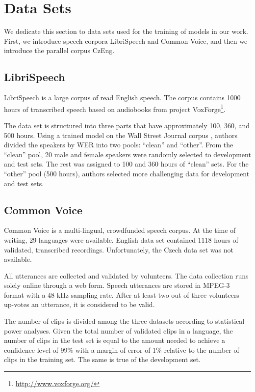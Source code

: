 \pagebreak
\section{Data Sets}
We dedicate this section to data sets used for the training of models in our work. First, we introduce speech corpora LibriSpeech and Common Voice, and then we introduce the parallel corpus CzEng.

\subsection{LibriSpeech}
LibriSpeech  is a large corpus of read English speech. The corpus contains 1000 hours of transcribed speech based on audiobooks from project VoxForge\footnote{\url{http://www.voxforge.org/}}.

The data set is structured into three parts that have approximately 100, 360, and 500 hours. Using a trained model on the Wall Street Journal corpus , authors divided the speakers by WER into two pools: ``clean'' and ``other''. From the ``clean'' pool, 20 male and female speakers were randomly selected to development and test sets. The rest was assigned to 100 and 360 hours of ``clean'' sets. For the ``other'' pool (500 hours), authors selected more challenging data for development and test sets.

\subsection{Common Voice}

Common Voice  is a multi-lingual, crowdfunded speech corpus. At the time of writing, 29 languages were available. English data set contained 1118 hours of validated, transcribed recordings. Unfortunately, the Czech data set was not available.

All utterances are collected and validated by volunteers. The data collection runs solely online through a web form. Speech utterances are stored in MPEG-3 format with a 48 kHz sampling rate. After at least two out of three volunteers up-votes an utterance, it is considered to be valid.

The number of clips is divided among the three datasets according to statistical power analyses.  Given the total number of validated clips in a language, the number of clips in the test set is equal to the amount needed to achieve a confidence level of 99\% with a margin of error of 1\% relative to the number of clips in the training set.  The same is true of the development set.

